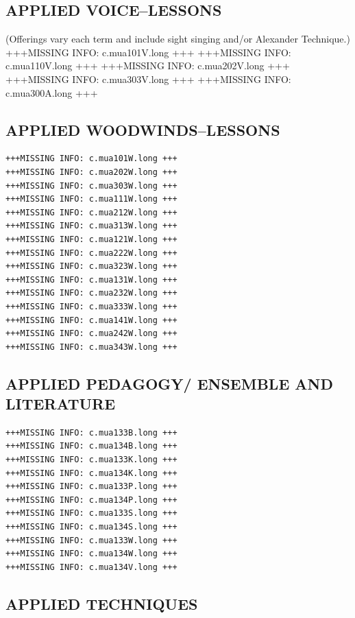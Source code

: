 \documentclass[
  letterpaper,
]{scrbook}
\begin{document}
\hypertarget{applied-voicelessons}{%
\subsection{APPLIED VOICE--LESSONS}\label{applied-voicelessons}}

(Offerings vary each term and include sight singing and/or Alexander
Technique.) +++MISSING INFO: c.mua101V.long +++ +++MISSING INFO:
c.mua110V.long +++ +++MISSING INFO: c.mua202V.long +++ +++MISSING INFO:
c.mua303V.long +++ +++MISSING INFO: c.mua300A.long +++

\hypertarget{applied-woodwindslessons}{%
\subsection{APPLIED WOODWINDS--LESSONS}\label{applied-woodwindslessons}}

\begin{verbatim}
+++MISSING INFO: c.mua101W.long +++
+++MISSING INFO: c.mua202W.long +++
+++MISSING INFO: c.mua303W.long +++
+++MISSING INFO: c.mua111W.long +++
+++MISSING INFO: c.mua212W.long +++
+++MISSING INFO: c.mua313W.long +++
+++MISSING INFO: c.mua121W.long +++
+++MISSING INFO: c.mua222W.long +++
+++MISSING INFO: c.mua323W.long +++
+++MISSING INFO: c.mua131W.long +++
+++MISSING INFO: c.mua232W.long +++
+++MISSING INFO: c.mua333W.long +++
+++MISSING INFO: c.mua141W.long +++
+++MISSING INFO: c.mua242W.long +++
+++MISSING INFO: c.mua343W.long +++
\end{verbatim}

\hypertarget{applied-pedagogy-ensemble-and-literature}{%
\subsection{APPLIED PEDAGOGY/ ENSEMBLE AND
LITERATURE}\label{applied-pedagogy-ensemble-and-literature}}

\begin{verbatim}
+++MISSING INFO: c.mua133B.long +++
+++MISSING INFO: c.mua134B.long +++
+++MISSING INFO: c.mua133K.long +++
+++MISSING INFO: c.mua134K.long +++
+++MISSING INFO: c.mua133P.long +++
+++MISSING INFO: c.mua134P.long +++
+++MISSING INFO: c.mua133S.long +++
+++MISSING INFO: c.mua134S.long +++
+++MISSING INFO: c.mua133W.long +++
+++MISSING INFO: c.mua134W.long +++
+++MISSING INFO: c.mua134V.long +++
\end{verbatim}

\hypertarget{applied-techniques}{%
\subsection{APPLIED TECHNIQUES}\label{applied-techniques}}
\end{document}
